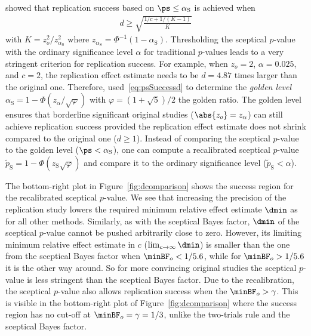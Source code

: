 \citet{Held2021} showed that replication success based on
$\ps \leq \alpha_{\mathrm{S}}$ is achieved when
\begin{align}
  \label{eq:psSuccessd}
  d \geq \sqrt{\frac{1/c + 1/(K - 1)}{K}}
\end{align}
with $K = z_{o}^{2}/z_{\alpha_{\mathrm{S}}}^{2}$ where
$z_{\alpha_{\mathrm{S}}} = \Phi^{-1}(1 - \alpha_{\mathrm{S}})$. Thresholding the
sceptical $p$-value with the ordinary significance level $\alpha$ for
traditional $p$-values leads to a very stringent criterion for replication
success. For example, when $z_{o} = 2$, $\alpha = 0.025$, and
$c = 2$, the replication effect estimate needs to be
$d = 4.87$ times larger than the original one. Therefore,
\citet{Held2021} used~\eqref{eq:psSuccessd} to determine the \emph{golden level}
$\alpha_{\mathrm{S}} = 1 - \Phi(z_\alpha/\sqrt{\varphi})$ with
$\varphi = (1 + \sqrt{5})/2$ the golden ratio. The golden level ensures that
borderline significant original studies ($\abs{z_{o}} = z_{\alpha}$) can still
achieve replication success provided the replication effect estimate does not
shrink compared to the original one ($d \geq 1$). Instead of comparing the
sceptical $p$-value to the golden level ($\ps < \alpha_{\mathrm{S}}$), one can
compute a recalibrated sceptical $p$-value
$\tilde{p}_{\mathrm{S}} = 1 - \Phi(z_{\mathrm{S}} \sqrt{\varphi})$ and compare it to
the ordinary significance level ($\tilde{p}_{\mathrm{S}} < \alpha$).

The bottom-right plot in Figure~\ref{fig:dcomparison} shows the success region
for the recalibrated sceptical $p$-value. We see that increasing the precision
of the replication study lowers the required minimum relative effect estimate
$\dmin$ as for all other methods. Similarly, as with the sceptical Bayes factor,
$\dmin$ of the sceptical $p$-value cannot be pushed arbitrarily close to zero.
However, its limiting minimum relative effect estimate in $c$
($\lim_{c \to \infty}\dmin$) is smaller than the one from the sceptical Bayes
factor when $\minBF_{o} < 1/5.6$, while for
$\minBF_{o} > 1/5.6$ it is the other way around. So for more
convincing original studies the sceptical $p$-value is less stringent than the
sceptical Bayes factor. Due to the recalibration, the sceptical $p$-value also
allows replication success when the $\minBF_{o} > \gamma$. This is visible in
the bottom-right plot of Figure~\ref{fig:dcomparison} where the success region
has no cut-off at $\minBF_{o} = \gamma = 1/3$, unlike the two-trials rule and
the sceptical Bayes factor.

